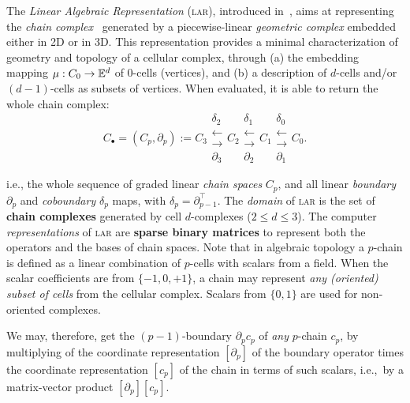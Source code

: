 The \emph{Linear Algebraic Representation} (\textsc{lar}), introduced in~\cite{Dicarlo:2014:TNL:2543138.2543294}, aims at representing the \emph{chain complex}~\cite{DiCarlo2009,TSAS} generated by a piecewise-linear \emph{geometric complex} embedded either in 2D or in 3D. This representation provides a minimal characterization of geometry and topology of a cellular complex, through (a) the embedding mapping $\mu : C_0 \to \mathbb{E}^d$ of 0-cells (vertices), and (b) a description of $d$-cells and/or $(d-1)$-cells as subsets of vertices. When evaluated, it is able to return the whole chain complex:
\begin{equation}
C_\bullet = (C_p, \partial_p) := 
C_3 
\substack{
\delta_2 \\
\longleftarrow \\
\longrightarrow \\
\partial_3 
}
C_2 
\substack{
\delta_1 \\
\longleftarrow \\
\longrightarrow \\
\partial_2 
}
C_1  
\substack{
\delta_0 \\
\longleftarrow  \\
\longrightarrow \\
\partial_1 
}
C_0 .
\end{equation}

\noindent
i.e., the whole sequence of graded linear \emph{chain spaces} $C_p$, and all linear \emph{boundary} $\partial_p$ and \emph{coboundary} $\delta_p$ maps, with $\delta_p=\partial_{p-1}^\top$.
 The \emph{domain} of \textsc{lar} is the set of \textbf{chain complexes} generated by cell $d$-complexes ($2\leq d\leq 3$). The computer \emph{representations} of \textsc{lar} are \textbf{sparse binary matrices} to represent both the operators and the bases of chain spaces. Note that in algebraic topology a $p$-chain is defined as a linear combination of $p$-cells with scalars from a field. When the scalar coefficients are from $\{-1, 0, +1\}$, a chain may represent \emph{any (oriented) subset of cells} from the cellular complex.
Scalars from $\{0, 1\}$ are used for non-oriented complexes.

We may, therefore, get the $(p-1)$-boundary $\partial_p c_p$ of \emph{any} $p$-chain $c_p$, by multiplying of the coordinate representation $[\partial_p]$ of the boundary operator times the coordinate representation $[c_p]$ of the chain in terms of such scalars, i.e.,~by a  matrix-vector product $ [\partial_p] [c_p] $.

